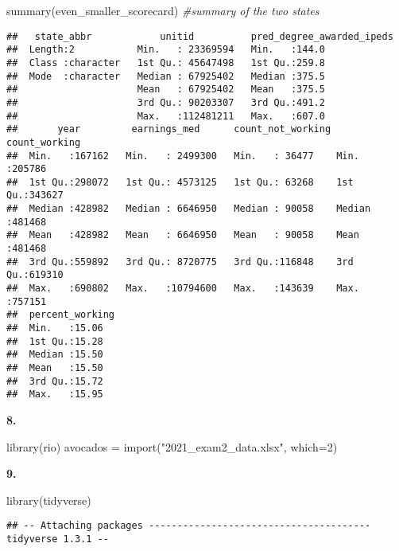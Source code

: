 \documentclass[
]{article}
\newenvironment{Shaded}{\begin{snugshade}}{\end{snugshade}}
\newcommand{\AttributeTok}[1]{\textcolor[rgb]{0.77,0.63,0.00}{#1}}
\newcommand{\CommentTok}[1]{\textcolor[rgb]{0.56,0.35,0.01}{\textit{#1}}}
\newcommand{\DecValTok}[1]{\textcolor[rgb]{0.00,0.00,0.81}{#1}}
\newcommand{\FunctionTok}[1]{\textcolor[rgb]{0.00,0.00,0.00}{#1}}
\newcommand{\NormalTok}[1]{#1}
\newcommand{\OtherTok}[1]{\textcolor[rgb]{0.56,0.35,0.01}{#1}}
\newcommand{\StringTok}[1]{\textcolor[rgb]{0.31,0.60,0.02}{#1}}
\begin{document}
\begin{Shaded}
\begin{Highlighting}[]
\FunctionTok{summary}\NormalTok{(even\_smaller\_scorecard) }\CommentTok{\#summary of the two states}
\end{Highlighting}
\end{Shaded}

\begin{verbatim}
##   state_abbr            unitid          pred_degree_awarded_ipeds
##  Length:2           Min.   : 23369594   Min.   :144.0            
##  Class :character   1st Qu.: 45647498   1st Qu.:259.8            
##  Mode  :character   Median : 67925402   Median :375.5            
##                     Mean   : 67925402   Mean   :375.5            
##                     3rd Qu.: 90203307   3rd Qu.:491.2            
##                     Max.   :112481211   Max.   :607.0            
##       year         earnings_med      count_not_working count_working   
##  Min.   :167162   Min.   : 2499300   Min.   : 36477    Min.   :205786  
##  1st Qu.:298072   1st Qu.: 4573125   1st Qu.: 63268    1st Qu.:343627  
##  Median :428982   Median : 6646950   Median : 90058    Median :481468  
##  Mean   :428982   Mean   : 6646950   Mean   : 90058    Mean   :481468  
##  3rd Qu.:559892   3rd Qu.: 8720775   3rd Qu.:116848    3rd Qu.:619310  
##  Max.   :690802   Max.   :10794600   Max.   :143639    Max.   :757151  
##  percent_working
##  Min.   :15.06  
##  1st Qu.:15.28  
##  Median :15.50  
##  Mean   :15.50  
##  3rd Qu.:15.72  
##  Max.   :15.95
\end{verbatim}

\textbf{8. }

\begin{Shaded}
\begin{Highlighting}[]
\FunctionTok{library}\NormalTok{(rio)}
\NormalTok{avocados }\OtherTok{=} \FunctionTok{import}\NormalTok{(}\StringTok{"2021\_exam2\_data.xlsx"}\NormalTok{, }\AttributeTok{which=}\DecValTok{2}\NormalTok{)}
\end{Highlighting}
\end{Shaded}

\textbf{9. }

\begin{Shaded}
\begin{Highlighting}[]
\FunctionTok{library}\NormalTok{(tidyverse)}
\end{Highlighting}
\end{Shaded}

\begin{verbatim}
## -- Attaching packages --------------------------------------- tidyverse 1.3.1 --
\end{verbatim}
\end{document}
